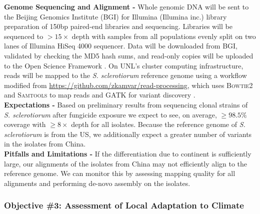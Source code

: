 \documentclass[12pt,letterpaper]{article}
\begin{document}
\noindent \textbf{Genome Sequencing and Alignment -}
Whole genomic DNA will be sent to the Beijing Genomics Institute (BGI) for Illumina (Illumina inc.) library preparation of 150bp paired-end libraries and sequencing. Libraries will be sequenced to $>15\times$ depth with samples from all populations evenly split on two lanes of Illumina HiSeq 4000 sequencer.
Data will be downloaded from BGI, validated by checking the MD5 hash sums, and read-only copies will be uploaded to the Open Science Framework \citep{nosek2017osf}. 
On UNL's cluster computing infrastructure, reads will be mapped to the \textit{S. sclerotiorum} reference genome using a workflow modified from \url{https://github.com/zkamvar/read-processing}, which uses \textsc{Bowtie2} and \textsc{Samtools} to map reads and \textsc{GATK} for variant discovery \citep{langmead2012fast, li2009sequence, mckenna2010genome, derbyshire2017complete}.\\ 
\noindent \textbf{Expectations -}
Based on preliminary results from sequencing clonal strains of \textit{S. sclerotiorum} after fungicide exposure we expect to see, on average, $\geq98.5\%$ coverage with $\geq8\times$ depth for all isolates. Because the reference genome of \textit{S. sclerotiorum} is from the US, we additionally expect a greater number of variants in the isolates from China.\\
\noindent \textbf{Pitfalls and Limitations -}
If the differentiation due to continent is sufficiently large, our alignments of the isolates from China may not efficiently align to the reference genome. 
We can monitor this by assessing mapping quality for all alignments and performing de-novo assembly on the isolates.

\subsubsection*{Objective \#3: Assessment of Local Adaptation to Climate}
\end{document}

